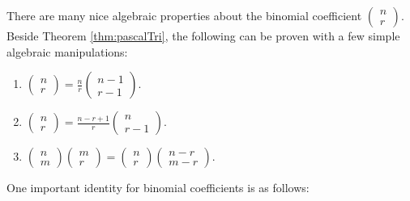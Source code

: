 \documentclass[math]{amznotes}
\theoremstyle{remark}
\begin{document}
There are many nice algebraic properties about the binomial coefficient $\left(\begin{smallmatrix}
    n \\
    r
\end{smallmatrix}\right)$. Beside Theorem \ref{thm:pascalTri}, the following can be proven with a few simple algebraic manipulations:
\begin{enumerate}
    \item $\begin{pmatrix}
        n \\
        r
    \end{pmatrix} = \frac{n}{r}\begin{pmatrix}
        n - 1 \\
        r - 1
    \end{pmatrix}$.
    \item $\begin{pmatrix}
        n \\
        r
    \end{pmatrix} = \frac{n - r + 1}{r}\begin{pmatrix}
        n \\
        r - 1
    \end{pmatrix}$.
    \item $\begin{pmatrix}
        n \\
        m
    \end{pmatrix}\begin{pmatrix}
        m \\
        r
    \end{pmatrix} = \begin{pmatrix}
        n \\
        r
    \end{pmatrix}\begin{pmatrix}
        n - r \\
        m - r
    \end{pmatrix}$.
\end{enumerate}
One important identity for binomial coefficients is as follows:
\end{document}
